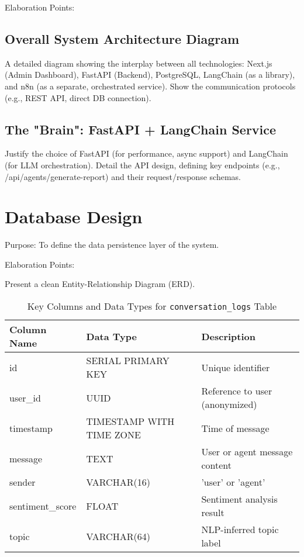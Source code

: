 Elaboration Points:

\subsection{Overall System Architecture Diagram}
A detailed diagram showing the interplay between all technologies: Next.js (Admin Dashboard), FastAPI (Backend), PostgreSQL, LangChain (as a library), and n8n (as a separate, orchestrated service). Show the communication protocols (e.g., REST API, direct DB connection).

\subsection{The "Brain": FastAPI + LangChain Service}
Justify the choice of FastAPI (for performance, async support) and LangChain (for LLM orchestration). Detail the API design, defining key endpoints (e.g., /api/agents/generate-report) and their request/response schemas.

\section{Database Design}
Purpose: To define the data persistence layer of the system.

Elaboration Points:

Present a clean Entity-Relationship Diagram (ERD).

\begin{table}[h]
    \centering
    \caption{Key Columns and Data Types for \texttt{conversation\_logs} Table}
    \label{tab:conversation-logs}
    \begin{tabular}{|l|l|l|}
        \hline
        \textbf{Column Name} & \textbf{Data Type} & \textbf{Description} \\
        \hline
        id & SERIAL PRIMARY KEY & Unique identifier \\
        user\_id & UUID & Reference to user (anonymized) \\
        timestamp & TIMESTAMP WITH TIME ZONE & Time of message \\
        message & TEXT & User or agent message content \\
        sender & VARCHAR(16) & 'user' or 'agent' \\
        sentiment\_score & FLOAT & Sentiment analysis result \\
        topic & VARCHAR(64) & NLP-inferred topic label \\
        \hline
    \end{tabular}
\end{table}

